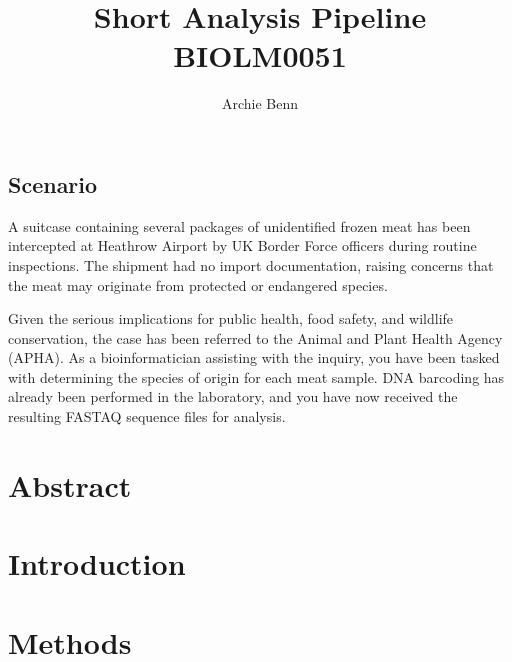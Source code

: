 \documentclass[12pt]{article}
\title{\LARGE\textbf{Short Analysis Pipeline}\\\vspace{1mm}\large BIOLM0051}
\author{Archie Benn}
\date{}
\begin{document}
\maketitle

\subsection*{Scenario}
A suitcase containing several packages of unidentified frozen meat has been intercepted at Heathrow Airport by UK Border Force officers during routine inspections. The shipment had no import documentation, raising concerns that the meat may originate from protected or endangered species.\newline

Given the serious implications for public health, food safety, and wildlife conservation, the case has been referred to the Animal and Plant Health Agency (APHA). As a bioinformatician assisting with the inquiry, you have been tasked with determining the species of origin for each meat sample. DNA barcoding has already been performed in the laboratory, and you have now received the resulting FASTAQ sequence files for analysis.



\section*{Abstract} %




\section*{Introduction}




\section*{Methods}
\end{document}
